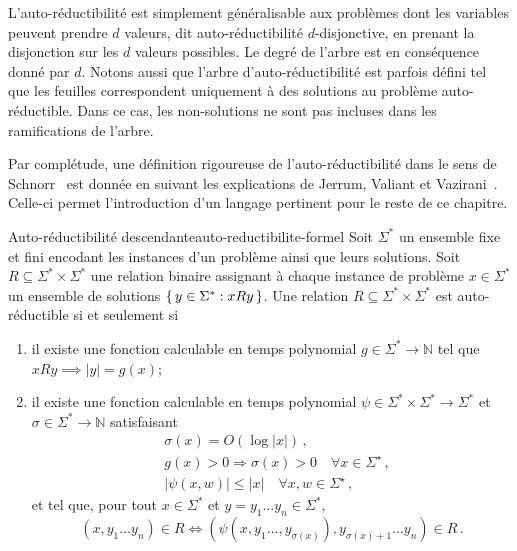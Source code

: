 L'auto-réductibilité est simplement généralisable aux problèmes dont les variables peuvent prendre $d$ valeurs, dit auto-réductibilité $d$-disjonctive, en prenant la disjonction sur les $d$ valeurs possibles. Le degré de l'arbre est en conséquence donné par $d$. Notons aussi que l'arbre d'auto-réductibilité est parfois défini tel que les feuilles correspondent uniquement à des solutions au problème auto-réductible. Dans ce cas, les non-solutions ne sont pas incluses dans les ramifications de l'arbre.

Par complétude, une définition rigoureuse de l'auto-réductibilité dans le sens de Schnorr~\cite{schnorrOptimalAlgorithmsSelfReducible1976} est donnée en suivant les explications de Jerrum, Valiant et Vazirani~\cite{jerrumRandomGenerationCombinatorial1986}. Celle-ci permet l'introduction d'un langage pertinent pour le reste de ce chapitre.

\begin{maindefinition}{Auto-réductibilité descendante}{auto-reductibilite-formel}
    Soit $\Sigma^{*}$ un ensemble fixe et fini encodant les instances d'un problème ainsi que leurs solutions. Soit $R \subseteq \Sigma^{*} \times \Sigma^{*}$ une relation binaire assignant à chaque instance de problème $x \in \Sigma^{*}$ un ensemble de solutions $\set{ y \in \Sigma^{*} : xRy }$. Une relation $R \subseteq \Sigma^{*} \times \Sigma^{*}$ est auto-réductible si et seulement si
    \begin{enumerate}[(1)]
        \item il existe une fonction calculable en temps polynomial $g \in \Sigma^{*} \to \mathbb{N}$ tel que $xRy \implies \lvert y \rvert = g(x)$;
        \item il existe une fonction calculable en temps polynomial $\psi \in \Sigma^{*} \times \Sigma^{*} \to \Sigma^{*}$ et $\sigma \in \Sigma^{*} \to \mathbb{N}$ satisfaisant
        \begin{align*}
            & \sigma(x)=O(\log |x|) \,, \\
            & g(x)>0 \Rightarrow \sigma(x)>0 \quad \forall x \in \Sigma^{\star} \,, \\
            & |\psi(x, w)| \leqslant|x| \quad \forall x, w \in \Sigma^{\star} \,,
        \end{align*}
        et tel que, pour tout $x \in \Sigma^{*}$ et $y=y_1 \ldots y_n \in \Sigma^{*}$, 
        \begin{equation*}
            \left ( x, y_1 \ldots y_n \right ) \in R \Leftrightarrow \left ( \psi \left( x, y_1 \ldots, y_{\sigma(x)} \right), y_{\sigma(x)+1} \ldots y_n \right ) \in R \,.
        \end{equation*}
    \end{enumerate}
\end{maindefinition}

